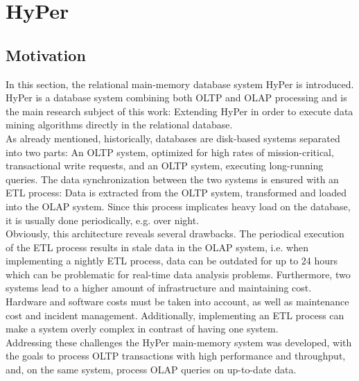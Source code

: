 \chapter{HyPer}\label{chapter:hyper}
\section{Motivation}
In this section, the relational main-memory database system HyPer is introduced. HyPer is a database system combining both OLTP and OLAP processing and is the main research subject of this work: Extending HyPer in order to execute data mining algorithms directly in the relational database.
\\
As already mentioned, historically, databases are disk-based systems separated into two parts: An OLTP system, optimized for high rates of mission-critical, transactional write requests, and an OLTP system, executing long-running queries. The data synchronization between the two systems is ensured with an ETL process: Data is extracted from the OLTP system, transformed and loaded into the OLAP system. Since this process implicates heavy load on the database, it is usually done periodically, e.g. over night. 
\\
Obviously, this architecture reveals several drawbacks. The periodical execution of the ETL process results in stale data in the OLAP system, i.e. when implementing a nightly ETL process, data can be outdated for up to 24 hours which can be problematic for real-time data analysis problems. Furthermore, two systems lead to a higher amount of infrastructure and maintaining cost. Hardware and software costs must be taken into account, as well as maintenance cost and incident management. Additionally, implementing an ETL process can make a system overly complex in contrast of having one system.
\\
Addressing these challenges the HyPer main-memory system was developed, with the goals to process OLTP transactions with high performance and throughput, and, on the same system, process OLAP queries on up-to-date data. 

